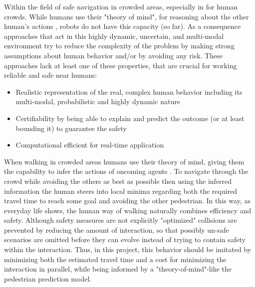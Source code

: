 Within the field of safe navigation in crowded areas, especially in for human crowds. While humans use their "theory of mind", for reasoning about the other human's actions \cite{Gweon2013}, robots do not have this capacity (so far). As a consequence approaches that act in this highly dynamic, uncertain, and multi-modal environment try to reduce the complexity of the problem by making strong assumptions about human behavior and/or by avoiding any risk. These approaches lack at least one of these properties, that are crucial for working reliable and safe near humans: 

\begin{itemize}
\item Realistic representation of the real, complex human behavior including its multi-modal, probabilistic and highly dynamic nature
\item Certifiability by being able to explain and predict the outcome (or at least bounding it) to guarantee the safety 
\item Computational efficient for real-time application
\end{itemize}

When walking in crowded areas humans use their theory of mind, giving them the capability to infer the actions of oncoming agents \cite{Ivanovic2018} \cite{Gweon2013}. To navigate through the crowd while avoiding the others as best as possible then using the inferred information the human steers into local minima regarding both the required travel time to reach some goal and avoiding the other pedestrian. In this way, as everyday life shows, the human way of walking naturally combines efficiency and safety. Although safety measures are not explicitly "optimized" collisions are prevented by reducing the amount of interaction, so that possibly un-safe scenarios are omitted before they can evolve instead of trying to contain safety within the interaction. Thus, in this project, this behavior should be imitated by minimizing both the estimated travel time and a cost for minimizing the interaction in parallel, while being informed by a "theory-of-mind"-like the pedestrian prediction model. 




